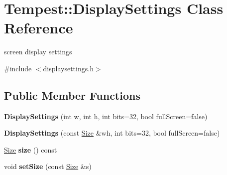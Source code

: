 \hypertarget{class_tempest_1_1_display_settings}{\section{Tempest\+:\+:Display\+Settings Class Reference}
\label{class_tempest_1_1_display_settings}
}


screen display settings  




{\ttfamily \#include $<$displaysettings.\+h$>$}

\subsection*{Public Member Functions}
\begin{DoxyCompactItemize}
\item 
\hypertarget{class_tempest_1_1_display_settings_ae2695e8a3ef62e51ee14f763dc2a5da8}{{\bfseries Display\+Settings} (int w, int h, int bits=32, bool full\+Screen=false)}\label{class_tempest_1_1_display_settings_ae2695e8a3ef62e51ee14f763dc2a5da8}

\item 
\hypertarget{class_tempest_1_1_display_settings_af8bf6999fcbff3e9595c1e4e414664f8}{{\bfseries Display\+Settings} (const \hyperlink{struct_tempest_1_1_size}{Size} \&wh, int bits=32, bool full\+Screen=false)}\label{class_tempest_1_1_display_settings_af8bf6999fcbff3e9595c1e4e414664f8}

\item 
\hypertarget{class_tempest_1_1_display_settings_a1f7c227843fccdace05445f7406765ba}{\hyperlink{struct_tempest_1_1_size}{Size} {\bfseries size} () const }\label{class_tempest_1_1_display_settings_a1f7c227843fccdace05445f7406765ba}

\item 
\hypertarget{class_tempest_1_1_display_settings_a57d319c49348403338106bc26a741be2}{void {\bfseries set\+Size} (const \hyperlink{struct_tempest_1_1_size}{Size} \&s)}\label{class_tempest_1_1_display_settings_a57d319c49348403338106bc26a741be2}

\end{DoxyCompactItemize}
